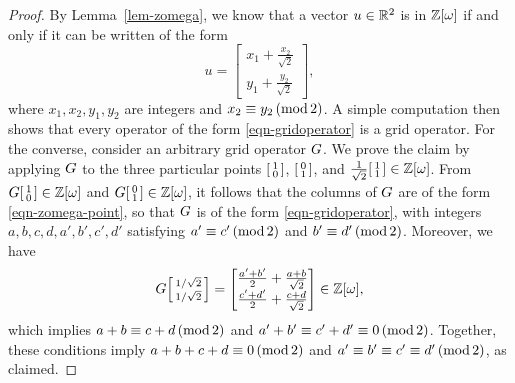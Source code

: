 \documentclass{article}
\begin{document}
\begin{proof}
  By Lemma~\ref{lem-zomega}, we know that a vector $u\in{\mathbb{R}}^2$ is in
  $\mathbb{Z}[\omega]$ if and only if it can be written of the form
  \begin{equation}\label{eqn-zomega-point}
    u = \left[\begin{matrix} x_1+\frac{x_2}{\sqrt{2}} \\ y_1+\frac{y_2}{\sqrt{2}}
      \end{matrix}\right],
  \end{equation}
  where $x_1,x_2,y_1,y_2$ are integers and $x_2\equiv y_2\,(\mathop{{\rm mod}}2)$.
  A simple computation then shows that every operator of the
  form {\eqref{eqn-gridoperator}} is a grid operator. For the
  converse, consider an arbitrary grid operator $G$. We prove the
  claim by applying $G$ to the three particular points
  $\begin{bsmallmatrix}1\\0\end{bsmallmatrix}$,
  $\begin{bsmallmatrix}0\\1\end{bsmallmatrix}$, and
  $\frac{1}{\sqrt{2}}\begin{bsmallmatrix}1\\1\end{bsmallmatrix} \in
  \mathbb{Z}[\omega]$.  From
  $G\begin{bsmallmatrix}1\\0\end{bsmallmatrix}\in\mathbb{Z}[\omega]$ and
  $G\begin{bsmallmatrix}0\\1\end{bsmallmatrix}\in\mathbb{Z}[\omega]$, it
  follows that the columns of $G$ are of the form
  {\eqref{eqn-zomega-point}}, so that $G$ is of the form
  {\eqref{eqn-gridoperator}}, with integers
  $a,b,c,d,a',b',c',d'$ satisfying $a'\equiv c'\,(\mathop{{\rm mod}}2)$ and
  $b'\equiv d'\,(\mathop{{\rm mod}}2)$. Moreover, we have
  \[ G\begin{bsmallmatrix}1/\sqrt 2\\1/\sqrt 2\end{bsmallmatrix} =
  \begin{bmatrix}
    \frac{a'+b'}{2}+\frac{a+b}{\sqrt2}\\
    \frac{c'+d'}{2}+\frac{c+d}{\sqrt2}
  \end{bmatrix}\in\mathbb{Z}[\omega],
  \]
  which implies $a+b\equiv c+d\,(\mathop{{\rm mod}}2)$ and $a'+b'\equiv
  c'+d'\equiv 0\,(\mathop{{\rm mod}}2)$. Together, these conditions imply
  $a+b+c+d \equiv 0\,(\mathop{{\rm mod}}2)$ and $a'\equiv b'\equiv c' \equiv
  d'\,(\mathop{{\rm mod}}2)$, as claimed.
\end{proof}
\end{document}

